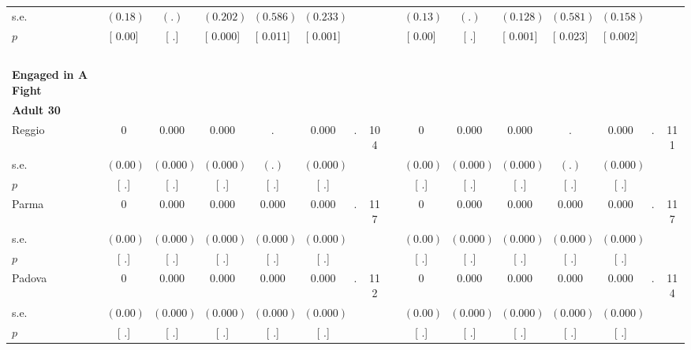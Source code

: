\begin{longtable}{L{8em} c c c c c c c p{1em} c c c c c c c}
\quad \quad \quad \quad s.e.& $ (     0.18)$ & $ (        .)$ & $ (    0.202)$ & $ (    0.586)$ & $ (    0.233)$ & & & & $ (     0.13)$ & $ (        .)$ & $ (    0.128)$ & $ (    0.581)$ & $ (    0.158)$ & &  \\*
\quad \quad \quad \quad $ p$ & [     0.00] & [        .] & [    0.000] & [    0.011] & [    0.001] & & & & [     0.00] & [        .] & [    0.001] & [    0.023] & [    0.002] & &  \\[1em]
~\\[1em]
\textbf{Engaged in A Fight} \\*
\quad \quad \textbf{Adult 30} & & & & & & & & & & & & & & & \\* 
\quad \quad \quad Reggio& 0 &     0.000 &     0.000 &         . &     0.000 &         . &       104 & & 0 &     0.000 &     0.000 &         . &     0.000 &         . &       111  \\*
\quad \quad \quad \quad s.e.& $ (     0.00)$ & $ (    0.000)$ & $ (    0.000)$ & $ (        .)$ & $ (    0.000)$ & & & & $ (     0.00)$ & $ (    0.000)$ & $ (    0.000)$ & $ (        .)$ & $ (    0.000)$ & &  \\*
\quad \quad \quad \quad $ p$ & [        .] & [        .] & [        .] & [        .] & [        .] & & & & [        .] & [        .] & [        .] & [        .] & [        .] & &  \\[1em]
\quad \quad \quad Parma& 0 &     0.000 &     0.000 &     0.000 &     0.000 &         . &       117 & & 0 &     0.000 &     0.000 &     0.000 &     0.000 &         . &       117  \\*
\quad \quad \quad \quad s.e.& $ (     0.00)$ & $ (    0.000)$ & $ (    0.000)$ & $ (    0.000)$ & $ (    0.000)$ & & & & $ (     0.00)$ & $ (    0.000)$ & $ (    0.000)$ & $ (    0.000)$ & $ (    0.000)$ & &  \\*
\quad \quad \quad \quad $ p$ & [        .] & [        .] & [        .] & [        .] & [        .] & & & & [        .] & [        .] & [        .] & [        .] & [        .] & &  \\[1em]
\quad \quad \quad Padova& 0 &     0.000 &     0.000 &     0.000 &     0.000 &         . &       112 & & 0 &     0.000 &     0.000 &     0.000 &     0.000 &         . &       114  \\*
\quad \quad \quad \quad s.e.& $ (     0.00)$ & $ (    0.000)$ & $ (    0.000)$ & $ (    0.000)$ & $ (    0.000)$ & & & & $ (     0.00)$ & $ (    0.000)$ & $ (    0.000)$ & $ (    0.000)$ & $ (    0.000)$ & &  \\*
\quad \quad \quad \quad $ p$ & [        .] & [        .] & [        .] & [        .] & [        .] & & & & [        .] & [        .] & [        .] & [        .] & [        .] & &  \\[1em]

\end{longtable}
